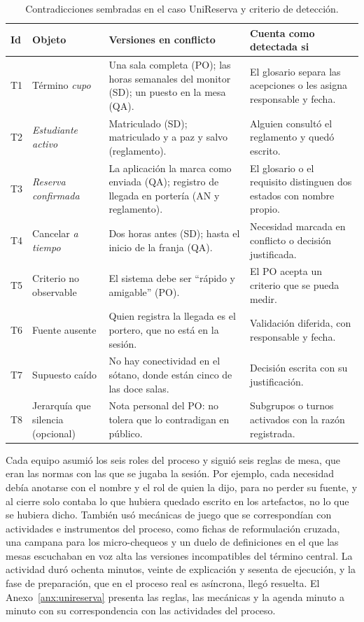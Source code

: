 \documentclass[12pt,letterpaper,oneside]{report}
\begin{document}
\begin{table}[H]
\caption{Contradicciones sembradas en el caso UniReserva y criterio de detección.}
\label{tab:contradicciones}
\centering
\footnotesize
\renewcommand{\arraystretch}{1.12}
\begin{tabularx}{\textwidth}{@{}L{0.7cm} L{2.6cm} Y Y@{}}
\toprule
\textbf{Id} & \textbf{Objeto} & \textbf{Versiones en conflicto} &
\textbf{Cuenta como detectada si} \\
\midrule
T1 & Término \textit{cupo} & Una sala completa (PO); las horas semanales del
monitor (SD); un puesto en la mesa (QA). & El glosario separa las acepciones o
les asigna responsable y fecha. \\
T2 & \textit{Estudiante activo} & Matriculado (SD); matriculado y a paz y salvo
(reglamento). & Alguien consultó el reglamento y quedó escrito. \\
T3 & \textit{Reserva confirmada} & La aplicación la marca como enviada (QA);
registro de llegada en portería (AN y reglamento). & El glosario o el requisito
distinguen dos estados con nombre propio. \\
T4 & Cancelar \textit{a tiempo} & Dos horas antes (SD); hasta el inicio de la
franja (QA). & Necesidad marcada en conflicto o decisión justificada. \\
T5 & Criterio no observable & El sistema debe ser ``rápido y amigable'' (PO). &
El PO acepta un criterio que se pueda medir. \\
T6 & Fuente ausente & Quien registra la llegada es el portero, que no está en la
sesión. & Validación diferida, con responsable y fecha. \\
T7 & Supuesto caído & No hay conectividad en el sótano, donde están cinco de las
doce salas. & Decisión escrita con su justificación. \\
T8 & Jerarquía que silencia (opcional) & Nota personal del PO: no tolera que lo
contradigan en público. & Subgrupos o turnos activados con la razón
registrada. \\
\bottomrule
\end{tabularx}
\end{table}


Cada equipo asumió los seis roles del proceso y siguió seis reglas de mesa, que
eran las normas con las que se jugaba la sesión. Por ejemplo, cada necesidad
debía anotarse con el nombre y el rol de quien la dijo, para no perder su
fuente, y al cierre solo contaba lo que hubiera quedado escrito en los
artefactos, no lo que se hubiera dicho. También usó mecánicas de juego que se correspondían
con actividades e instrumentos del proceso, como fichas de reformulación cruzada,
una campana para los micro-chequeos y un duelo de definiciones en el que las
mesas escuchaban en voz alta las versiones incompatibles del término central. La
actividad duró ochenta minutos, veinte de explicación y sesenta de ejecución, y
la fase de preparación, que en el proceso real es asíncrona, llegó resuelta. El
Anexo~\ref{anx:unireserva} presenta las reglas, las mecánicas y la agenda minuto
a minuto con su correspondencia con las actividades del proceso.
\end{document}
